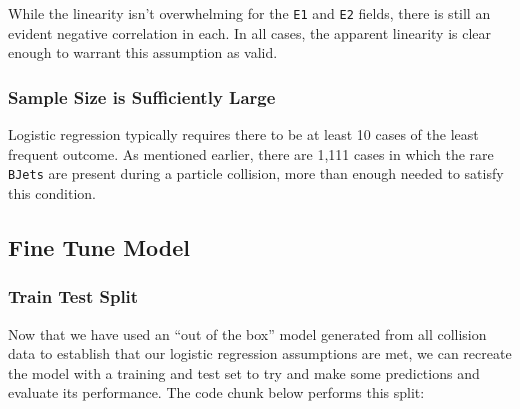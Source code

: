 \documentclass[
]{article}
\begin{document}
While the linearity isn't overwhelming for the \texttt{E1} and
\texttt{E2} fields, there is still an evident negative correlation in
each. In all cases, the apparent linearity is clear enough to warrant
this assumption as valid.

\hypertarget{sample-size-is-sufficiently-large}{%
\subsubsection{Sample Size is Sufficiently
Large}\label{sample-size-is-sufficiently-large}}

Logistic regression typically requires there to be at least 10 cases of
the least frequent outcome. As mentioned earlier, there are 1,111 cases
in which the rare \texttt{BJets} are present during a particle
collision, more than enough needed to satisfy this condition.

\hypertarget{fine-tune-model}{%
\subsection{Fine Tune Model}\label{fine-tune-model}}

\hypertarget{train-test-split}{%
\subsubsection{Train Test Split}\label{train-test-split}}

Now that we have used an ``out of the box'' model generated from all
collision data to establish that our logistic regression assumptions are
met, we can recreate the model with a training and test set to try and
make some predictions and evaluate its performance. The code chunk below
performs this split:
\end{document}
